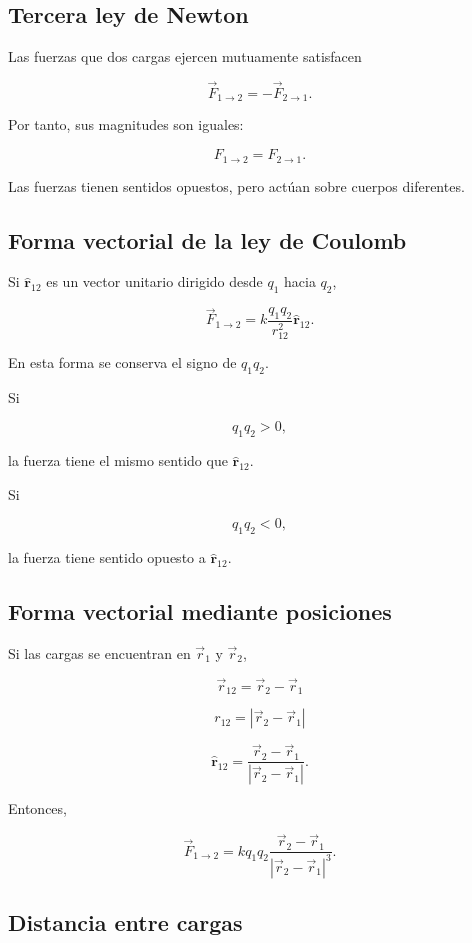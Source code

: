 \subsection{Tercera ley de Newton}

Las fuerzas que dos cargas ejercen mutuamente satisfacen

\[
\boxed{\vec{F}_{1\to2}=-\vec{F}_{2\to1}}.
\]

Por tanto, sus magnitudes son iguales:

\[
\boxed{F_{1\to2}=F_{2\to1}}.
\]

Las fuerzas tienen sentidos opuestos, pero actúan sobre cuerpos diferentes.


\subsection{Forma vectorial de la ley de Coulomb}

Si \(\hat{\mathbf r}_{12}\) es un vector unitario dirigido desde \(q_1\) hacia \(q_2\),

\[
\boxed{
\vec{F}_{1\to2}
=
k\frac{q_1q_2}{r_{12}^2}\hat{\mathbf r}_{12}
}.
\]

En esta forma se conserva el signo de \(q_1q_2\).

Si

\[
q_1q_2>0,
\]

la fuerza tiene el mismo sentido que \(\hat{\mathbf r}_{12}\).

Si

\[
q_1q_2<0,
\]

la fuerza tiene sentido opuesto a \(\hat{\mathbf r}_{12}\).


\subsection{Forma vectorial mediante posiciones}

Si las cargas se encuentran en \(\vec r_1\) y \(\vec r_2\),

\[
\boxed{\vec r_{12}=\vec r_2-\vec r_1}
\]

\[
\boxed{r_{12}=|\vec r_2-\vec r_1|}
\]

\[
\boxed{
\hat{\mathbf r}_{12}
=
\frac{\vec r_2-\vec r_1}{|\vec r_2-\vec r_1|}
}.
\]

Entonces,

\[
\boxed{
\vec F_{1\to2}
=
kq_1q_2
\frac{\vec r_2-\vec r_1}
{|\vec r_2-\vec r_1|^3}
}.
\]


\subsection{Distancia entre cargas}


